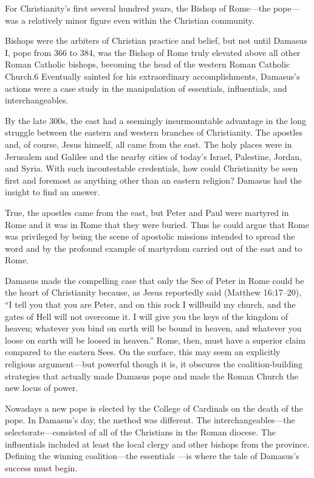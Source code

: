 \documentclass[10pt]{article}
\begin{document}
{\large For Christianity's first several hundred years, the Bishop of Rome---the
pope---was a relatively minor figure even within the Christian community.}

{\large Bishops were the arbiters of Christian practice and belief, but not
until Damasus I, pope from 366 to 384, was the Bishop of Rome truly elevated
above all other Roman Catholic bishops, becoming the head of the western Roman
Catholic Church.6 Eventually sainted for his extraordinary accomplishments,
Damasus's actions were a case study in the manipulation of essentials,
influentials, and interchangeables.}

{\large By the late 300s, the east had a seemingly insurmountable advantage in
the long struggle between the eastern and western branches of Christianity. The
apostles and, of course, Jesus himself, all came from the east. The holy places
were in Jerusalem and Galilee and the nearby cities of today's Israel, Palestine,
Jordan, and Syria. With such incontestable credentials, how could Christianity be
seen first and foremost as anything other than an eastern religion? Damasus had
the insight to find an answer.}

{\large True, the apostles came from the east, but Peter and Paul were martyred
in Rome and it was in Rome that they were buried. Thus he could argue that Rome
was privileged by being the scene of apostolic missions intended to spread the
word and by the profound example of martyrdom carried out of the east and to
Rome.}

{\large Damasus made the compelling case that only the See of Peter in Rome
could be the heart of Christianity because, as Jesus reportedly said (Matthew
16:17--20), ``I tell you that you are Peter, and on this rock I willbuild my
church, and the gates of Hell will not overcome it. I will give you the keys of
the kingdom of heaven; whatever you bind on earth will be bound in heaven, and
whatever you loose on earth will be loosed in heaven.'' Rome, then, must have a
superior claim compared to the eastern Sees. On the surface, this may seem an
explicitly religious argument---but powerful though it is, it obscures the
coalition-building strategies that actually made Damasus pope and made the Roman
Church the new locus of power.}

{\large Nowadays a new pope is elected by the College of Cardinals on the death
of the pope. In Damasus's day, the method was different. The
interchangeables---the selectorate---consisted of all of the Christians in the
Roman diocese. The influentials included at least the local clergy and other
bishops from the province. Defining the winning coalition---the essentials ---is
where the tale of Damasus's success must begin.}
\end{document}
